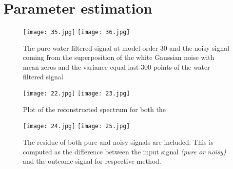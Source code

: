 \section{Parameter estimation}

\begin{figure}[!htbp]
%
\centering
\texttt{[image: 35.jpg]}
\endminipage\hfill
{}%
\centering
\texttt{[image: 36.jpg]}
\endminipage\hfill
\centering
\caption{The pure water filtered signal at model order 30 and the noisy signal coming from the superposition of the white Gaussian noise with mean zeros and the variance equal last 300 points of the water filtered signal}
\end{figure}



\begin{figure}[!htbp]
%
\centering
\texttt{[image: 22.jpg]}
\label{today1}
\endminipage\hfill
{}%
\centering
\texttt{[image: 23.jpg]}
\label{today2}
\endminipage\hfill
\caption{Plot of the reconstructed spectrum for both the }
\end{figure}


\begin{figure}[!htbp]
%
\centering
\texttt{[image: 24.jpg]}
\endminipage\hfill
{}%
\centering
\texttt{[image: 25.jpg]}
\endminipage\hfill
\centering
\caption{The residue of both pure and noisy signals are included. This is computed as the difference between the input signal \textit{(pure or noisy)} and the outcome signal for respective method.}
\end{figure}

